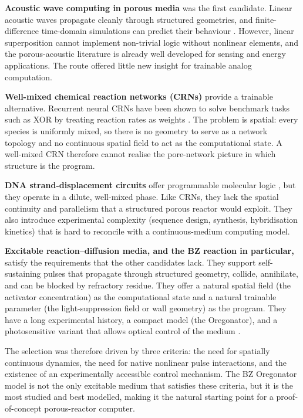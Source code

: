 \textbf{Acoustic wave computing in porous media} was the first candidate.
Linear acoustic waves propagate cleanly through structured geometries, and finite-difference time-domain simulations can predict their behaviour \cite{hughes2019wave}.
However, linear superposition cannot implement non-trivial logic without nonlinear elements, and the porous-acoustic literature is already well developed for sensing and energy applications.
The route offered little new insight for trainable analog computation.

\textbf{Well-mixed chemical reaction networks (CRNs)} provide a trainable alternative.
Recurrent neural CRNs have been shown to solve benchmark tasks such as XOR by treating reaction rates as weights \cite{dack2024rncrn}.
The problem is spatial: every species is uniformly mixed, so there is no geometry to serve as a network topology and no continuous spatial field to act as the computational state.
A well-mixed CRN therefore cannot realise the pore-network picture in which structure is the program.

\textbf{DNA strand-displacement circuits} offer programmable molecular logic \cite{cherry2018scaling}, but they operate in a dilute, well-mixed phase.
Like CRNs, they lack the spatial continuity and parallelism that a structured porous reactor would exploit.
They also introduce experimental complexity (sequence design, synthesis, hybridisation kinetics) that is hard to reconcile with a continuous-medium computing model.

\textbf{Excitable reaction--diffusion media, and the BZ reaction in particular,} satisfy the requirements that the other candidates lack.
They support self-sustaining pulses that propagate through structured geometry, collide, annihilate, and can be blocked by refractory residue.
They offer a natural spatial field (the activator concentration) as the computational state and a natural trainable parameter (the light-suppression field or wall geometry) as the program.
They have a long experimental history, a compact model (the Oregonator), and a photosensitive variant that allows optical control of the medium \cite{sakurai2002design}.

The selection was therefore driven by three criteria: the need for spatially continuous dynamics, the need for native nonlinear pulse interactions, and the existence of an experimentally accessible control mechanism.
The BZ Oregonator model is not the only excitable medium that satisfies these criteria, but it is the most studied and best modelled, making it the natural starting point for a proof-of-concept porous-reactor computer.

